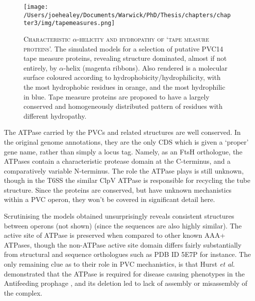 \begin{figure}[h]
 \thispagestyle{IHA-fancy-style}
 \centering
   \texttt{[image: /Users/joehealey/Documents/Warwick/PhD/Thesis/chapters/chapter3/img/tapemeasures.png]}
 \captionsetup{singlelinecheck=off, justification=justified, font=footnotesize, aboveskip=10pt}
 \caption[Conservation mapping off putative tail fibre structures]{\textsc{\normalsize Characteristic $\alpha$-helicity and hydropathy of `tape measure proteins'.}\vspace{0.1cm} \newline The simulated models for a selection of putative PVC14 tape measure proteins, revealing structure dominated, almost if not entirely, by $\alpha$-helix (magenta ribbons). Also rendered is a molecular surface coloured according to hydrophobicity/hydrophilicity, with the most hydrophobic residues in orange, and the most hydrophilic in blue. Tape measure proteins are proposed to have a largely conserved and homogeneously distributed pattern of residues with different hydropathy.}
 \label{tapemeasures}
\end{figure}

\clearpage
{}
The ATPase carried by the PVCs and related structures are well conserved. In the original genome annotations, they are the only CDS which is given a `proper' gene name, rather than simply a locus tag. Namely, as an FtsH orthologue, the ATPases contain a characteristic protease domain at the C-terminus, and a comparatively variable N-terminus. The role the ATPase plays is still unknown, though in the T6SS the similar ClpV ATPase is responsible for recycling the tube structure. Since the proteins are conserved, but have unknown mechanistics within a PVC operon, they won't be covered in significant detail here.

Scrutinising the models obtained unsurprisingly reveals consistent structures between operons (not shown) (since the sequences are also highly similar). The active site of ATPase is preserved when compared to other known AAA+ ATPases, though the non-ATPase active site domain differs fairly substantially from structural and sequence orthologues such as PDB ID 5E7P for instance. The only remaining clue as to their role in PVC mechanistics, is that Hurst \emph{et al.} demonstrated that the ATPase is required for disease causing phenotypes in the Antifeeding prophage \citep{Hurst2004, Rybakova2013}, and its deletion led to lack of assembly or misassembly of the complex.


